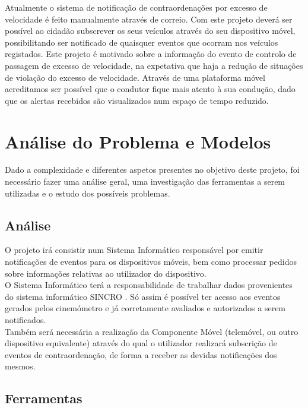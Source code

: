 \documentclass{article}
\begin{document}
Atualmente o sistema de notificação de contraordenações por excesso de
velocidade é feito manualmente através de correio. Com este projeto
deverá ser possível ao cidadão subscrever os seus veículos através do
seu dispositivo móvel, possibilitando ser notificado de quaisquer
eventos que ocorram nos veículos registados. Este projeto é motivado
sobre a informação do evento de controlo de passagem de excesso de
velocidade, na expetativa que haja a redução de situações de violação do
excesso de velocidade. Através de uma plataforma móvel acreditamos ser
possível que o condutor fique mais atento à sua condução, dado que os
alertas recebidos são visualizados num espaço de tempo reduzido.

\hypertarget{_an_lise_do_problema_e_modelos}{%
\section{Análise do Problema e
Modelos}\label{_an_lise_do_problema_e_modelos}}

Dado a complexidade e diferentes aspetos presentes no objetivo deste
projeto, foi necessário fazer uma análise geral, uma investigação das
ferramentas a serem utilizadas e o estudo dos possíveis problemas.

\hypertarget{_an_lise}{%
\subsection{Análise}\label{_an_lise}}

O projeto irá consistir num Sistema Informático responsável por emitir
notificações de eventos para os dispositivos móveis, bem como processar
pedidos sobre informações relativas ao utilizador do dispositivo.\\
O Sistema Informático terá a responsabilidade de trabalhar dados
provenientes do sistema informático SINCRO . Só assim é possível ter
acesso aos eventos gerados pelos cinemómetro e já corretamente avaliados
e autorizados a serem notificados.\\
Também será necessária a realização da Componente Móvel (telemóvel, ou
outro dispositivo equivalente) através do qual o utilizador realizará
subscrição de eventos de contraordenação, de forma a receber as devidas
notificações dos mesmos.

\hypertarget{_ferramentas}{%
\subsection{Ferramentas}\label{_ferramentas}}
\end{document}
